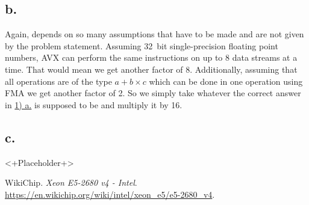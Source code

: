 \documentclass[a4paper, 11pt]{article}
\begin{document}
\subsection*{b.}
Again, depends on so many assumptions that have to be made and are not given by
the problem statement. Assuming \SI{32}{bit} single-precision floating point
numbers, AVX can perform the same instructions on up to 8 data streams at a
time. That would mean we get another factor of 8. Additionally, assuming that
all operations are of the type $a+b\times c$ which can be done in one operation
using FMA we get another factor of 2. So we simply take whatever the correct
answer in \hyperref[sec:1a]{1) a.} is supposed to be and multiply it by 16.

\subsection*{c.}
<+Placeholder+>

\begin{thebibliography}{9}
  WikiChip.
  \textit{Xeon E5-2680 v4 - Intel}.
  \href{https://en.wikichip.org/wiki/intel/xeon\_e5/e5-2680\_v4}
  {https://en.wikichip.org/wiki/intel/xeon\_e5/e5-2680\_v4}.
\end{thebibliography}
\end{document}

